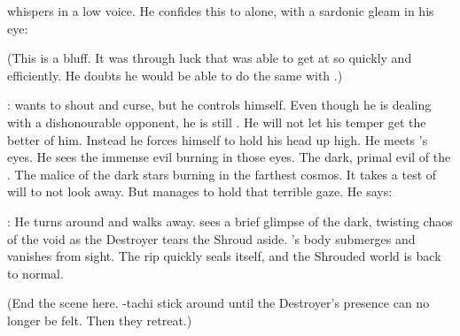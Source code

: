 
\Ishnaruchaefir whispers in a low voice.
He confides this to \Teshrial alone, with a sardonic gleam in his eye: 

(This is a bluff. It was through luck that \Ishnaruchaefir was able to get at \Urizeth so quickly and efficiently. He doubts he would be able to do the same with \Firaxel.)

\Teshrial:
\Teshrial wants to shout and curse, but he controls himself.
Even though he is dealing with a dishonourable opponent, he is still \CiriathSepher. 
He will not let his temper get the better of him. 
Instead he forces himself to hold his head up high.
He meets \Ishnaruchaefir's eyes.
He sees the immense evil burning in those eyes.
The dark, primal evil of the \xss. 
The malice of the dark stars burning in the farthest cosmos. 
It takes a test of will to not look away.
But \Teshrial manages to hold that terrible gaze. 
He says: 

\Ishnaruchaefir:
He turns around and walks away.
\Teshrial sees a brief glimpse of the dark, twisting chaos of the void as the Destroyer tears the Shroud aside. 
\Criseis's body submerges and vanishes from sight. 
The rip quickly seals itself, and the Shrouded world is back to normal. 

(End the scene here.
 \Teshrial-tachi stick around until the Destroyer's \vertex presence can no longer be felt. 
 Then they retreat.) 









